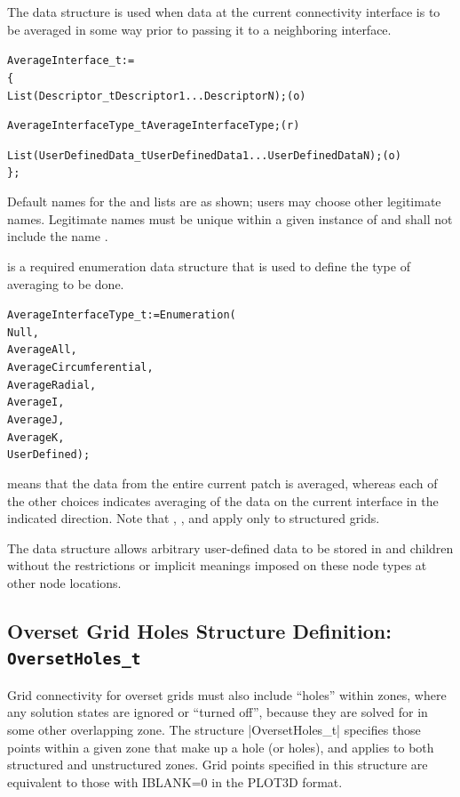 The  data structure is used when data at the
current connectivity interface is to be averaged in some way prior to
passing it to a neighboring interface.

\begin{alltt}
  AverageInterface\_t :=
    \{
    List( Descriptor\_t Descriptor1 ... DescriptorN ) ;                      (o)

    AverageInterfaceType\_t AverageInterfaceType ;                           (r)

    List( UserDefinedData\_t UserDefinedData1 ... UserDefinedDataN ) ;       (o)
    \} ;
\end{alltt}

\begin{notes}
\item
 Default names for the  and
  lists are as shown; users may choose other
 legitimate names.
 Legitimate names must be unique within a given instance of
  and shall not include the name
 .
\end{notes}

 is a required enumeration data structure
that is used to define the type of averaging to be done.
\begin{alltt}
  AverageInterfaceType_t := Enumeration(
    Null,
    AverageAll,
    AverageCircumferential,
    AverageRadial,
    AverageI,
    AverageJ,
    AverageK,
    UserDefined ) ;
\end{alltt}

 means that the data from the entire current patch is
averaged, whereas each of the other choices indicates averaging of the
data on the current interface in the indicated direction.
Note that , , and 
apply only to structured grids.

The  data structure allows arbitrary
user-defined data to be stored in  and
 children without the restrictions or implicit
meanings imposed on these node types at other node locations.

\subsection{Overset Grid Holes Structure Definition: \texttt{OversetHoles\_t}}
\label{s:OversetHoles}

Grid connectivity for overset grids must also include ``holes'' within zones,
where any solution states are ignored or ``turned off'', because they are
solved for in some other overlapping zone.  The structure |OversetHoles_t|
specifies those points within a given zone that make up a hole (or holes),
and applies to both structured and unstructured zones.
Grid points specified in this structure are equivalent to those with
IBLANK=0 in the PLOT3D format.

